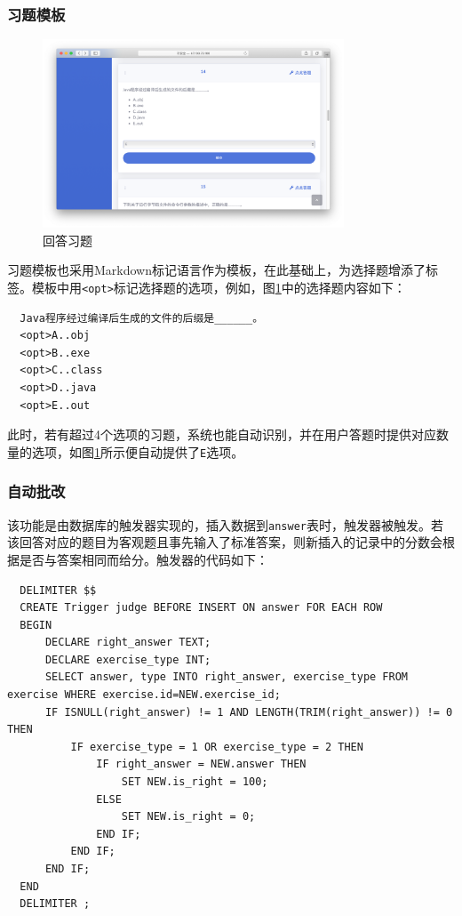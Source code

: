 \documentclass{nwafucoursepaper}
\begin{document}
\subsubsection{习题模板}

\begin{figure}[htp]
  \centering
  \includegraphics[width=0.8\textwidth]{answer_exercise.png}
  \caption{回答习题}
  \label{answer_exercise}
\end{figure}

习题模板也采用Markdown标记语言作为模板，在此基础上，为选择题增添了标签。模板中用\verb|<opt>|标记选择题的选项，例如，图\ref{answer_exercise}中的选择题内容如下：
\begin{lstlisting}
  Java程序经过编译后生成的文件的后缀是______。
  <opt>A..obj
  <opt>B..exe
  <opt>C..class
  <opt>D..java
  <opt>E..out
\end{lstlisting}
此时，若有超过4个选项的习题，系统也能自动识别，并在用户答题时提供对应数量的选项，如图\ref{answer_exercise}所示便自动提供了\verb|E|选项。

\subsubsection{自动批改}

该功能是由数据库的触发器实现的，插入数据到\verb|answer|表时，触发器被触发。若该回答对应的题目为客观题且事先输入了标准答案，则新插入的记录中的分数会根据是否与答案相同而给分。触发器的代码如下：
\lstset{language=sql}
\begin{lstlisting}
  DELIMITER $$
  CREATE Trigger judge BEFORE INSERT ON answer FOR EACH ROW
  BEGIN
      DECLARE right_answer TEXT;
      DECLARE exercise_type INT;
      SELECT answer, type INTO right_answer, exercise_type FROM exercise WHERE exercise.id=NEW.exercise_id;
      IF ISNULL(right_answer) != 1 AND LENGTH(TRIM(right_answer)) != 0 THEN
          IF exercise_type = 1 OR exercise_type = 2 THEN
              IF right_answer = NEW.answer THEN
                  SET NEW.is_right = 100;
              ELSE
                  SET NEW.is_right = 0;
              END IF;
          END IF;
      END IF;
  END
  DELIMITER ;
\end{lstlisting}
\end{document}
